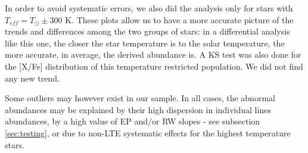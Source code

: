 \documentclass[oldversion]{aa}
\begin{document}
In order to avoid systematic errors, we also did the analysis only for stars with $T_{eff}=T_\odot\pm$300 K. These plots allow us to have a more accurate picture of the trends and differences among the two groups of stars: in a differential analysis like this one, the closer the star temperature is to the solar temperature, the more accurate, in average, the derived abundance is. A KS test was also done for the [X/Fe] distribution of this temperature restricted population. We did not find any new trend.

Some outliers may however exist in our sample. In all cases, the abnormal abundances may be explained by their high dispersion in individual lines abundances, by a high value of EP and/or RW slopes - see subsection \ref{sec:testing}, or due to non-LTE systematic effects for the highest temperature stars.

\end{document}
